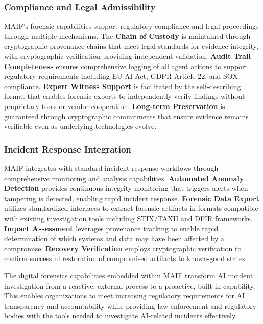 \documentclass[conference]{IEEEtran}
\begin{document}
\subsubsection{Compliance and Legal Admissibility}

MAIF's forensic capabilities support regulatory compliance and legal proceedings through multiple mechanisms. The \textbf{Chain of Custody} is maintained through cryptographic provenance chains that meet legal standards for evidence integrity, with cryptographic verification providing independent validation. \textbf{Audit Trail Completeness} ensures comprehensive logging of all agent actions to support regulatory requirements including EU AI Act, GDPR Article 22, and SOX compliance. \textbf{Expert Witness Support} is facilitated by the self-describing format that enables forensic experts to independently verify findings without proprietary tools or vendor cooperation. \textbf{Long-term Preservation} is guaranteed through cryptographic commitments that ensure evidence remains verifiable even as underlying technologies evolve.

\subsubsection{Incident Response Integration}

MAIF integrates with standard incident response workflows through comprehensive monitoring and analysis capabilities. \textbf{Automated Anomaly Detection} provides continuous integrity monitoring that triggers alerts when tampering is detected, enabling rapid incident response. \textbf{Forensic Data Export} utilizes standardized interfaces to extract forensic artifacts in formats compatible with existing investigation tools including STIX/TAXII and DFIR frameworks. \textbf{Impact Assessment} leverages provenance tracking to enable rapid determination of which systems and data may have been affected by a compromise. \textbf{Recovery Verification} employs cryptographic verification to confirm successful restoration of compromised artifacts to known-good states.

The digital forensics capabilities embedded within MAIF transform AI incident investigation from a reactive, external process to a proactive, built-in capability. This enables organizations to meet increasing regulatory requirements for AI transparency and accountability while providing law enforcement and regulatory bodies with the tools needed to investigate AI-related incidents effectively.
\end{document}
